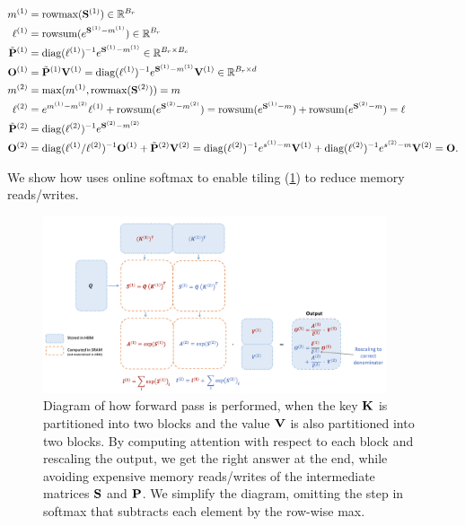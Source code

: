 \begin{align*}
  m^{(1)} &= \mathrm{rowmax}(\mathbf{S}^{(1)})  \in \mathbb{R}^{B_r}\\
  \ell^{(1)} &= \mathrm{rowsum}(e^{\mathbf{S}^{(1)} - m^{(1)}}) \in \mathbb{R}^{B_r} \\
  \tilde{\mathbf{P}}^{(1)} &= \mathrm{diag}(\ell^{(1)})^{-1} e^{\mathbf{S}^{(1)} - m^{(1)}} \in \mathbb{R}^{B_r \times B_c}\\
  \mathbf{O}^{(1)} &= \tilde{\mathbf{P}}^{(1)} \mathbf{V}^{(1)} = \mathrm{diag}(\ell^{(1)})^{-1} e^{\mathbf{S}^{(1)} - m^{(1)}} \mathbf{V}^{(1)} \in \mathbb{R}^{B_r \times d}\\
  m^{(2)} &= \max(m^{(1)}, \mathrm{rowmax}(\mathbf{S}^{(2)})) = m \\
  \ell^{(2)} &= e^{m^{(1)} - m^{(2)}} \ell^{(1)} + \mathrm{rowsum}(e^{\mathbf{S}^{(2)} - m^{(2)}}) = \mathrm{rowsum}(e^{\mathbf{S}^{(1)} - m}) + \mathrm{rowsum}(e^{\mathbf{S}^{(2)} - m}) = \ell \\
  \tilde{\mathbf{P}}^{(2)} &= \mathrm{diag}(\ell^{(2)})^{-1} e^{\mathbf{S}^{(2)} - m^{(2)}} \\
  \mathbf{O}^{(2)} &= \mathrm{diag}(\ell^{(1)} / \ell^{(2)})^{-1} \mathbf{O}^{(1)} + \tilde{\mathbf{P}}^{(2)} \mathbf{V}^{(2)} = \mathrm{diag}(\ell^{(2)})^{-1} e^{s^{(1)} - m} \mathbf{V}^{(1)} + \mathrm{diag}(\ell^{(2)})^{-1} e^{s^{(2)} - m} \mathbf{V}^{(2)} = \mathbf{O}.
\end{align*}

We show how \sysnameone uses online softmax to enable tiling
(\cref{fig:flash_attention_diagram}) to reduce memory reads/writes.
\begin{figure}[ht]
  \centering
  \includegraphics[width=0.9\textwidth]{figs/flash_attention_diagram.png}
  \caption{\label{fig:flash_attention_diagram}Diagram of how \sysnameone forward
    pass is performed, when the key $\mathbf{K}$ is partitioned into two blocks and the
    value $\mathbf{V}$ is also partitioned into two blocks.
    By computing attention with respect to each block and rescaling the output,
    we get the right answer at the end, while avoiding expensive memory
    reads/writes of the intermediate matrices $\mathbf{S}$ and $\mathbf{P}$.
    We simplify the diagram, omitting the step in softmax that subtracts each
    element by the row-wise max.}
\end{figure}

